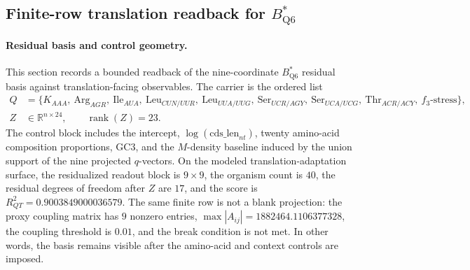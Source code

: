 \subsection{Finite-row translation readback for $B^\ast_{\mathrm{Q6}}$}\label{subsec:bstar-q6-translation-survival}
\paragraph{Residual basis and control geometry.}
This section records a bounded readback of the nine-coordinate $B^\ast_{\mathrm{Q6}}$ residual basis against translation-facing observables. The carrier is the ordered list
$$\begin{aligned}
Q &= \{K_{AAA},\ \mathrm{Arg}_{AGR},\ \mathrm{Ile}_{AUA},\ \mathrm{Leu}_{CUN/UUR},\ \mathrm{Leu}_{UUA/UUG},\ \mathrm{Ser}_{UCR/AGY},\ \mathrm{Ser}_{UCA/UCG},\ \mathrm{Thr}_{ACR/ACY},\ f_3\text{-stress}\},\\
Z &\in \mathbb{R}^{n\times 24},\qquad \operatorname{rank}(Z)=23.
\end{aligned}$$
The control block includes the intercept, $\log(\mathrm{cds\_len}_{nt})$, twenty amino-acid composition proportions, GC3, and the $M$-density baseline induced by the union support of the nine projected $q$-vectors. On the modeled translation-adaptation surface, the residualized readout block is $9\times 9$, the organism count is $40$, the residual degrees of freedom after $Z$ are $17$, and the score is $R^2_{QT}=0.9003849000036579$. The same finite row is not a blank projection: the proxy coupling matrix has $9$ nonzero entries, $\max |A_{ij}|=1882464.1106377328$, the coupling threshold is $0.01$, and the break condition is not met. In other words, the basis remains visible after the amino-acid and context controls are imposed.

